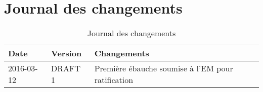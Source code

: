 \thispagestyle{default}

\section*{Journal des changements}
{}

\begin{table}[h]

    \centering

    \begin{tabularx}{\textwidth}{ @{} p{3cm} p{3cm} X @{} }

        \textbf{Date} & \textbf{Version} & \textbf{Changements}\\ \toprule

    	2016-03-12 & DRAFT 1 & Première ébauche soumise à l'EM pour ratification\\ 
    	
    	\bottomrule
    	

    \end{tabularx}

    \caption[Changements]{Journal des changements}

    \label{record-of-changes}

\end{table} 